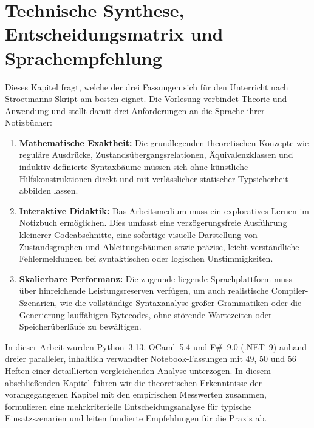 \chapter{Technische Synthese, Entscheidungsmatrix und Sprachempfehlung}
\label{chap:recommendation}

Dieses Kapitel fragt, welche der drei Fassungen sich für den Unterricht nach Stroetmanns Skript am besten eignet.
Die Vorlesung verbindet Theorie und Anwendung und stellt damit drei Anforderungen an die Sprache ihrer Notizbücher:
\begin{enumerate}
  \item \textbf{Mathematische Exaktheit:} Die grundlegenden theoretischen Konzepte wie reguläre Ausdrücke, Zustandsübergangsrelationen, Äquivalenzklassen und induktiv definierte Syntaxbäume müssen sich ohne künstliche Hilfskonstruktionen direkt und mit verlässlicher statischer Typsicherheit abbilden lassen.
  \item \textbf{Interaktive Didaktik:} Das Arbeitsmedium muss ein exploratives Lernen im Notizbuch ermöglichen.
  Dies umfasst eine verzögerungsfreie Ausführung kleinerer Codeabschnitte, eine sofortige visuelle Darstellung von Zustandsgraphen und Ableitungsbäumen sowie präzise, leicht verständliche Fehlermeldungen bei syntaktischen oder logischen Unstimmigkeiten.
  \item \textbf{Skalierbare Performanz:} Die zugrunde liegende Sprachplattform muss über hinreichende Leistungsreserven verfügen, um auch realistische Compiler-Szenarien, wie die vollständige Syntaxanalyse großer Grammatiken oder die Generierung lauffähigen Bytecodes, ohne störende Wartezeiten oder Speicherüberläufe zu bewältigen.
\end{enumerate}

In dieser Arbeit wurden Python~3.13, OCaml~5.4 und F\#~9.0 (.NET~9) anhand dreier paralleler, inhaltlich verwandter Notebook-Fassungen mit 49, 50 und 56 Heften einer detaillierten vergleichenden Analyse unterzogen.
In diesem abschließenden Kapitel führen wir die theoretischen Erkenntnisse der vorangegangenen Kapitel mit den empirischen Messwerten zusammen, formulieren eine mehrkriterielle Entscheidungsanalyse für typische Einsatzszenarien und leiten fundierte Empfehlungen für die Praxis ab.

